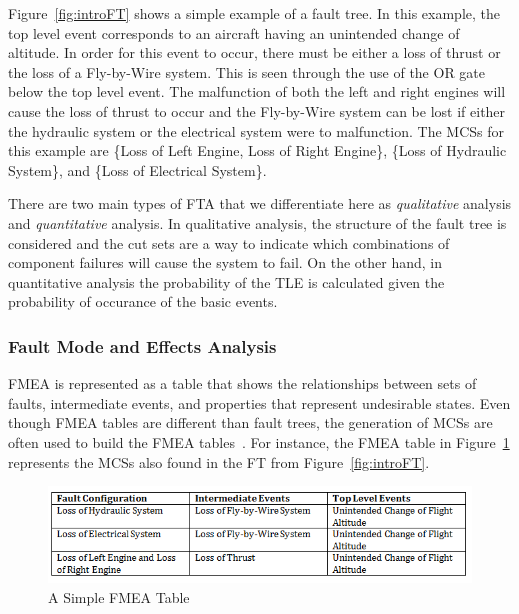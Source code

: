 Figure~\ref{fig:introFT} shows a simple example of a fault tree. In this example, the top level event corresponds to an aircraft having an unintended change of altitude. In order for this event to occur, there must be either a loss of thrust or the loss of a Fly-by-Wire system. This is seen through the use of the OR gate below the top level event. The malfunction of both the left and right engines will cause the loss of thrust to occur and the Fly-by-Wire system can be lost if either the hydraulic system or the electrical system were to malfunction. The MCSs for this example are \{Loss of Left Engine, Loss of Right Engine\}, \{Loss of Hydraulic System\}, and \{Loss of Electrical System\}. 

There are two main types of FTA that we differentiate here as \textit{qualitative} analysis and \textit{quantitative} analysis. In qualitative analysis, the structure of the fault tree is considered and the cut sets are a way to indicate which combinations of component failures will cause the system to fail. On the other hand, in quantitative analysis the probability of the TLE is calculated given the probability of occurance of the basic events. 


\subsubsection{Fault Mode and Effects Analysis}
FMEA is represented as a table that shows the relationships between sets of faults, intermediate events, and properties that represent undesirable states. Even though FMEA tables are different than fault trees, the generation of MCSs are often used to build the FMEA tables~\cite{Bozzano:2010:DSA:1951720}. For instance, the FMEA table in Figure~\ref{fig:introFMEA} represents the MCSs also found in the FT from Figure~\ref{fig:introFT}.

\begin{figure}[h]
\begin{center}
\includegraphics[width=13cm]{images/fmea.png}
\caption{A Simple FMEA Table} \label{fig:introFMEA}
\end{center}
\end{figure}

